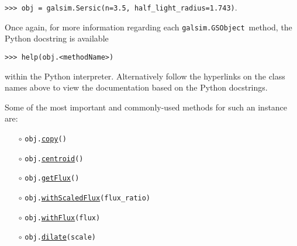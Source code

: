 \documentclass[preprint,11pt]{../../devel/modules/aastex}
\begin{document}
{\tt >>> obj = galsim.Sersic(n=3.5, half\_light\_radius=1.743)}.

Once again, for more information regarding each \texttt{galsim.GSObject}~method,
the Python docstring is available

{\tt >>> help(obj.<methodName>)}

within the Python interpreter.  Alternatively follow the hyperlinks on
the class names above to view the documentation based
on the Python docstrings.

Some of the most important and commonly-used methods for such an
instance are:
\begin{itemize}
\item[$\circ$]
  \texttt{obj.}\href{http://galsim-developers.github.com/GalSim/classgalsim_1_1base_1_1_g_s_object.html#aa0b398d4b0fca70211e4a73f81ea7e1a}{\texttt{copy}}\texttt{()}
\item[$\circ$]
  \texttt{obj.}\href{http://galsim-developers.github.com/GalSim/classgalsim_1_1base_1_1_g_s_object.html#a662d8ce421ecd90080bdcaaf6890aed8}{\texttt{centroid}}\texttt{()}
\item[$\circ$]
  \texttt{obj.}\href{http://galsim-developers.github.com/GalSim/classgalsim_1_1base_1_1_g_s_object.html#a662d8ce421ecd90080bdcaaf6890aed8}{\texttt{getFlux}}\texttt{()}
\item[$\circ$]
  \texttt{obj.}\href{http://galsim-developers.github.com/GalSim/classgalsim_1_1base_1_1_g_s_object.html#af4193645a9af52e7d54a044cafec8ab9}{\texttt{withScaledFlux}}\texttt{(flux\_ratio)}
\item[$\circ$]
  \texttt{obj.}\href{http://galsim-developers.github.com/GalSim/classgalsim_1_1base_1_1_g_s_object.html#a1993652591ddc802b734186391b28894}{\texttt{withFlux}}\texttt{(flux)}
\item[$\circ$]
  \texttt{obj.}\href{http://galsim-developers.github.com/GalSim/classgalsim_1_1base_1_1_g_s_object.html#a4301c73bbc1491ebb170e64c509cadd5}{\texttt{dilate}}\texttt{(scale)}

\end{itemize}
\end{document}
